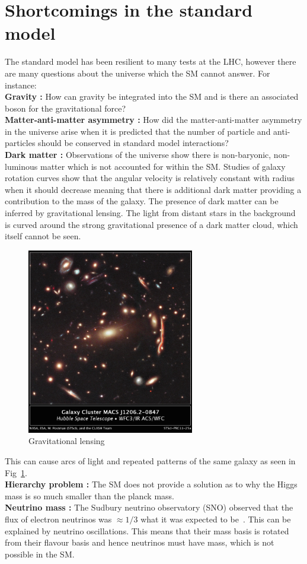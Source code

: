 \section{Shortcomings in the standard model}
The standard model has been resilient to many tests at the LHC, however there are many questions about the universe which the SM cannot answer. For instance:\\
{\bf Gravity :} How can gravity be integrated into the SM and is there an associated boson for the gravitational force? \\
{\bf Matter-anti-matter asymmetry :} How did the matter-anti-matter asymmetry in the universe arise when it is predicted that the number of particle and anti-particles should be conserved in standard model interactions?\\
{\bf Dark matter :} Observations of the universe show there is non-baryonic, non-luminous matter which is not accounted for within the SM. Studies of galaxy rotation curves show that the angular velocity is relatively constant with radius when it should decrease meaning that there is additional dark matter providing a contribution to the mass of the galaxy. The presence of dark matter can be inferred by gravitational lensing. The light from distant stars in the background is curved around the strong gravitational presence of a dark matter cloud, which itself cannot be seen. \begin{figure}[ht!]
\centering
    \includegraphics[width=0.65\textwidth]{images/Theory/lensing2.jpg}
    \caption{Gravitational lensing}
    \label{fig:ttbarAdd}
\end{figure}
This can cause arcs of light and repeated patterns of the same galaxy as seen in Fig~\ref{fig:ttbarAdd}.\\
{\bf Hierarchy problem :} The SM does not provide a solution as to why the Higgs mass is so much smaller than the planck mass.\\
{\bf Neutrino mass :}
The Sudbury neutrino observatory (SNO) observed that the flux of electron neutrinos was $\approx 1/3$ what it was expected to be~\cite{PhysRevC.88.025501}. This can be explained by neutrino oscillations. This means that their mass basis is rotated from their flavour basis and hence neutrinos must have mass, which is not possible in the SM.



